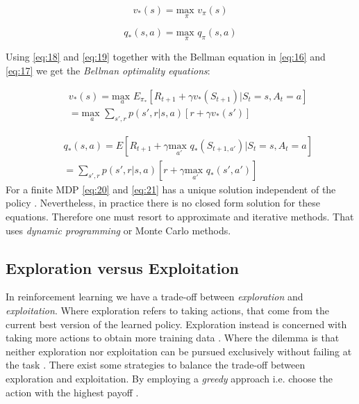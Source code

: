 \documentclass{kththesis}
\theoremstyle{definition}
\begin{document}
\begin{equation}
    \label{eq:18}
    v_{*}(s) = \underset{\pi}{\text{max }} v_{\pi}(s)
\end{equation}

\begin{equation}
    \label{eq:19}
    q_{*}(s,a) = \underset{\pi}{\text{max }} q_{\pi}(s,a)
\end{equation}

Using \autoref{eq:18} and \autoref{eq:19} together with the Bellman equation in \autoref{eq:16} and \autoref{eq:17} we get the \textit{Bellman optimality equations}:

\begin{equation}
\label{eq:20}
\begin{aligned}
& & v_{*}(s) =  \underset{a}{\text{max }} 
E_{\pi_{*}}[R_{t+1} + \gamma v_{*}(S_{t+1}) | S_t =s, A_t = a] \\
& & = \underset{a}{\text{max }} 
\sum_{s', r}^{}{p(s', r | s,a)}[r + \gamma v_{*}(s')]
\end{aligned}
\end{equation}

\begin{equation}
\label{eq:21}
\begin{aligned}
& & q_{*}(s,a) = 
E[R_{t+1} + \gamma \underset{a'}{\text{max }}q_{*}(S_{t+1, a'}) | S_t =s, A_t = a] \\
& & =  \sum_{s', r}^{}{p(s', r | s,a)}[r + \gamma \underset{a'}{\text{max }}q_{*}(s',a')]
\end{aligned}
\end{equation}
For a finite MDP \autoref{eq:20} and \autoref{eq:21} has a unique solution independent of the policy \parencite{sutton1998reinforcement}. Nevertheless, in practice there is no closed form solution for these equations. Therefore one must resort to approximate and iterative methods. That uses \textit{dynamic programming} or Monte Carlo methods.

\subsection{Exploration versus Exploitation}
In reinforcement learning we have a trade-off between \textit{exploration} and \textit{exploitation}. Where exploration refers to taking actions, that come from the current best version of the learned policy. Exploration instead is concerned with taking more actions to obtain more training data \parencite{goodfellow2016deep}. Where the dilemma is that neither exploration nor exploitation can be pursued exclusively without failing at the task \parencite{sutton1998reinforcement}. There exist some strategies to balance the trade-off between exploration and exploitation. By employing a \textit{greedy} approach i.e. choose the action with the highest payoff \parencite{sutton1998reinforcement, szepesvari2009algorithms}.
\end{document}
